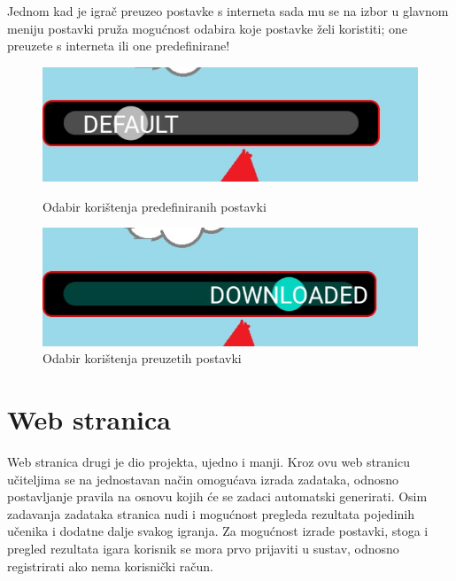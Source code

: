 \documentclass[times, utf8, zavrsni, numeric]{fer}
\begin{document}
		Jednom kad je igrač preuzeo postavke s interneta sada mu se na izbor u glavnom meniju postavki pruža mogućnost odabira koje postavke želi koristiti; one preuzete s interneta ili one predefinirane!
		
				\begin{figure}[!htb]
			\begin{minipage}{0.48\textwidth}
				\centering
				\includegraphics[scale=0.25]{"slike/usedefault.jpg"} 
				\caption{Odabir korištenja predefiniranih postavki}
				\label{fig:saw1}
			\end{minipage}\hfill
			\begin{minipage}{0.48\textwidth}
				\centering
				\includegraphics[scale=0.25]{"slike/usedownloaded.jpg"} 
				\caption{Odabir korištenja preuzetih postavki}
				\label{fig:saw2}
			\end{minipage}
		\end{figure}
		
		

	\section{Web stranica}
	Web stranica drugi je dio projekta, ujedno i manji. Kroz ovu web stranicu učiteljima se na jednostavan način omogućava izrada zadataka, odnosno postavljanje pravila na osnovu kojih će se zadaci automatski generirati.
	Osim zadavanja zadataka stranica nudi i mogućnost pregleda rezultata pojedinih učenika i dodatne dalje svakog igranja. Za mogućnost izrade postavki, stoga i pregled rezultata igara korisnik se mora prvo prijaviti u sustav, odnosno
	registrirati ako nema korisnički račun.
\end{document}
